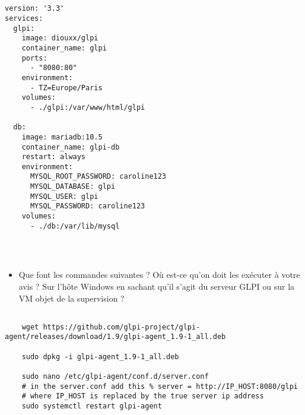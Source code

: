 \documentclass[12pt, letterpaper]{article}
\begin{document}
\begin{verbatim}


version: '3.3'
services:
  glpi:
    image: diouxx/glpi
    container_name: glpi
    ports:
      - "8080:80"
    environment:
      - TZ=Europe/Paris
    volumes:
      - ./glpi:/var/www/html/glpi

  db:
    image: mariadb:10.5
    container_name: glpi-db
    restart: always
    environment:
      MYSQL_ROOT_PASSWORD: caroline123
      MYSQL_DATABASE: glpi
      MYSQL_USER: glpi
      MYSQL_PASSWORD: caroline123
    volumes:
      - ./db:/var/lib/mysql


    
\end{verbatim}


\begin{itemize}
    \item Que font les commandes suivantes ? Où est-ce qu'on doit les exécuter à votre avis ? Sur l'hôte Windows en sachant qu'il s'agit du serveur GLPI ou sur la VM objet de la supervision ?
\end{itemize}

\begin{verbatim}
    
    wget https://github.com/glpi-project/glpi-agent/releases/download/1.9/glpi-agent_1.9-1_all.deb
    
    sudo dpkg -i glpi-agent_1.9-1_all.deb

    sudo nano /etc/glpi-agent/conf.d/server.conf
    # in the server.conf add this % server = http://IP_HOST:8080/glpi 
    # where IP_HOST is replaced by the true server ip address
    sudo systemctl restart glpi-agent
    
\end{verbatim}
\end{document}
